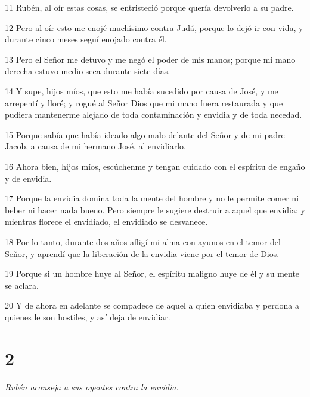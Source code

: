 \par 11 Rubén, al oír estas cosas, se entristeció porque quería devolverlo a su padre.

\par 12 Pero al oír esto me enojé muchísimo contra Judá, porque lo dejó ir con vida, y durante cinco meses seguí enojado contra él.

\par 13 Pero el Señor me detuvo y me negó el poder de mis manos; porque mi mano derecha estuvo medio seca durante siete días.

\par 14 Y supe, hijos míos, que esto me había sucedido por causa de José, y me arrepentí y lloré; y rogué al Señor Dios que mi mano fuera restaurada y que pudiera mantenerme alejado de toda contaminación y envidia y de toda necedad.

\par 15 Porque sabía que había ideado algo malo delante del Señor y de mi padre Jacob, a causa de mi hermano José, al envidiarlo.

\par 16 Ahora bien, hijos míos, escúchenme y tengan cuidado con el espíritu de engaño y de envidia.

\par 17 Porque la envidia domina toda la mente del hombre y no le permite comer ni beber ni hacer nada bueno. Pero siempre le sugiere destruir a aquel que envidia; y mientras florece el envidiado, el envidiado se desvanece.

\par 18 Por lo tanto, durante dos años afligí mi alma con ayunos en el temor del Señor, y aprendí que la liberación de la envidia viene por el temor de Dios.

\par 19 Porque si un hombre huye al Señor, el espíritu maligno huye de él y su mente se aclara.

\par 20 Y de ahora en adelante se compadece de aquel a quien envidiaba y perdona a quienes le son hostiles, y así deja de envidiar.



\chapter{2}

\par \textit{Rubén aconseja a sus oyentes contra la envidia.}

